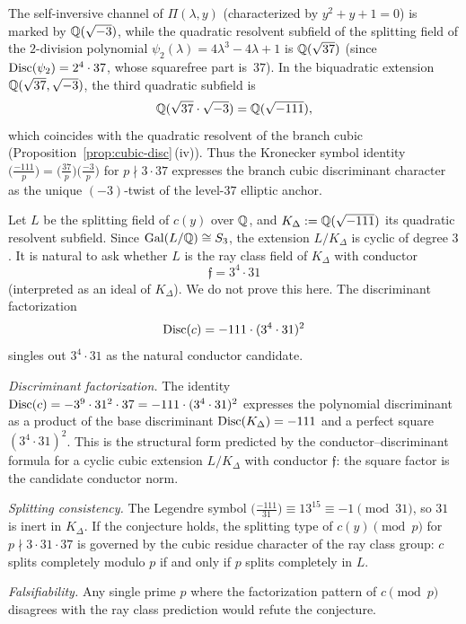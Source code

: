 \begin{remark}\label{rmk:sqrt-minus-111}
The self-inversive channel of $\Pi(\lambda,y)$ (characterized by $y^2+y+1=0$) is marked by $\mathbb{Q}(\sqrt{-3})$, while the quadratic resolvent subfield of the splitting field of the $2$-division polynomial $\psi_2(\lambda)=4\lambda^3-4\lambda+1$ is $\mathbb{Q}(\sqrt{37})$ (since $\operatorname{Disc}(\psi_2)=2^4\cdot 37$, whose squarefree part is~$37$).
In the biquadratic extension $\mathbb{Q}(\sqrt{37},\sqrt{-3})$, the third quadratic subfield is
\[
\mathbb{Q}(\sqrt{37}\cdot\sqrt{-3})=\mathbb{Q}(\sqrt{-111}),
\]
which coincides with the quadratic resolvent of the branch cubic (Proposition~\ref{prop:cubic-disc}\,(iv)).
Thus the Kronecker symbol identity $\bigl(\frac{-111}{p}\bigr)=\bigl(\frac{37}{p}\bigr)\bigl(\frac{-3}{p}\bigr)$ for $p\nmid 3\cdot 37$ expresses the branch cubic discriminant character as the unique $(-3)$-twist of the level-$37$ elliptic anchor.
\end{remark}

\begin{remark}\label{rem:ray-class-field}
Let $L$ be the splitting field of $c(y)$ over $\mathbb{Q}$, and $K_\Delta:=\mathbb{Q}(\sqrt{-111})$ its quadratic resolvent subfield.
Since \(\mathrm{Gal}(L/\mathbb{Q})\cong S_3\), the extension \(L/K_\Delta\) is cyclic of degree \(3\).
It is natural to ask whether \(L\) is the ray class field of \(K_\Delta\) with conductor
\[
\mathfrak{f}=3^4\cdot 31
\]
(interpreted as an ideal of \(K_\Delta\)).
We do not prove this here.
The discriminant factorization
\[
\operatorname{Disc}(c)=-111\cdot(3^4\cdot 31)^2
\]
singles out \(3^4\cdot 31\) as the natural conductor candidate.
\end{remark}

\begin{remark}\label{rmk:ray-class-evidence}
\emph{Discriminant factorization.}
The identity $\operatorname{Disc}(c)=-3^9\cdot 31^2\cdot 37=-111\cdot(3^4\cdot 31)^2$ expresses the polynomial discriminant as a product of the base discriminant $\operatorname{Disc}(K_\Delta)=-111$ and a perfect square $(3^4\cdot 31)^2$.
This is the structural form predicted by the conductor--discriminant formula for a cyclic cubic extension \(L/K_\Delta\) with conductor \(\mathfrak{f}\): the square factor is the candidate conductor norm.

\emph{Splitting consistency.}
The Legendre symbol $\bigl(\frac{-111}{31}\bigr)\equiv 13^{15}\equiv -1\pmod{31}$, so $31$ is inert in $K_\Delta$.
If the conjecture holds, the splitting type of $c(y)\pmod{p}$ for $p\nmid 3\cdot 31\cdot 37$ is governed by the cubic residue character of the ray class group: $c$ splits completely modulo $p$ if and only if $p$ splits completely in $L$.

\emph{Falsifiability.}
Any single prime $p$ where the factorization pattern of $c\pmod{p}$ disagrees with the ray class prediction would refute the conjecture.
\end{remark}

